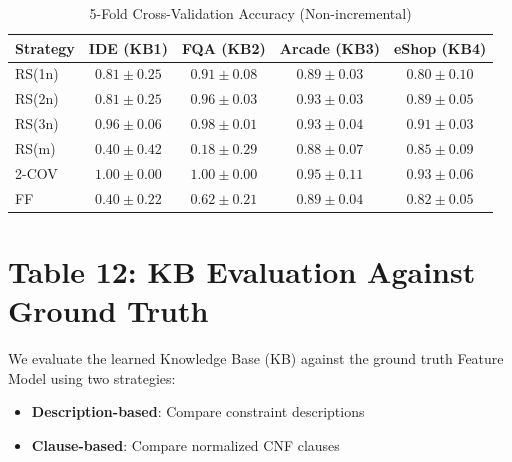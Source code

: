 \documentclass[11pt]{article}
\begin{document}
\begin{table}[htbp]
\centering
\caption{5-Fold Cross-Validation Accuracy (Non-incremental)}
\label{tab:cv_accuracy}
\begin{tabular}{lcccc}
\toprule
\textbf{Strategy} & \textbf{IDE (KB1)} & \textbf{FQA (KB2)} & \textbf{Arcade (KB3)} & \textbf{eShop (KB4)} \\
\midrule
RS(1n) & $0.81 \pm 0.25$ & $0.91 \pm 0.08$ & $0.89 \pm 0.03$ & $0.80 \pm 0.10$ \\
RS(2n) & $0.81 \pm 0.25$ & $0.96 \pm 0.03$ & $0.93 \pm 0.03$ & $0.89 \pm 0.05$ \\
RS(3n) & $0.96 \pm 0.06$ & $0.98 \pm 0.01$ & $0.93 \pm 0.04$ & $0.91 \pm 0.03$ \\
RS(m)  & $0.40 \pm 0.42$ & $0.18 \pm 0.29$ & $0.88 \pm 0.07$ & $0.85 \pm 0.09$ \\
2-COV  & $1.00 \pm 0.00$ & $1.00 \pm 0.00$ & $0.95 \pm 0.11$ & $0.93 \pm 0.06$ \\
FF     & $0.40 \pm 0.22$ & $0.62 \pm 0.21$ & $0.89 \pm 0.04$ & $0.82 \pm 0.05$ \\
\bottomrule
\end{tabular}
\end{table}

\section{Table 12: KB Evaluation Against Ground Truth}

We evaluate the learned Knowledge Base (KB) against the ground truth Feature Model using two strategies:
\begin{itemize}
    \item \textbf{Description-based}: Compare constraint descriptions
    \item \textbf{Clause-based}: Compare normalized CNF clauses
\end{itemize}
\end{document}
